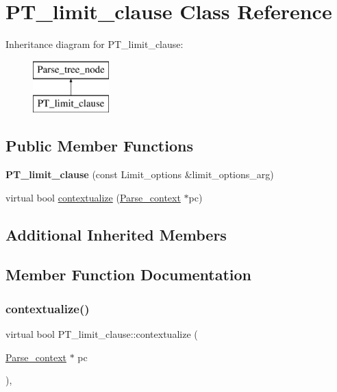 \hypertarget{classPT__limit__clause}{}\section{P\+T\+\_\+limit\+\_\+clause Class Reference}
\label{classPT__limit__clause}
Inheritance diagram for P\+T\+\_\+limit\+\_\+clause\+:\begin{figure}[H]
\begin{center}
\leavevmode
\includegraphics[height=2.000000cm]{classPT__limit__clause}
\end{center}
\end{figure}
\subsection*{Public Member Functions}
\begin{DoxyCompactItemize}
\item 
\mbox{\label{classPT__limit__clause_ad1430e91bf094c4a4a11a90a0a62ad64}} 
{\bfseries P\+T\+\_\+limit\+\_\+clause} (const Limit\+\_\+options \&limit\+\_\+options\+\_\+arg)
\item 
virtual bool \mbox{\hyperlink{classPT__limit__clause_a90ceb3c85a9f3ae67c5317b30d166b13}{contextualize}} (\mbox{\hyperlink{structParse__context}{Parse\+\_\+context}} $\ast$pc)
\end{DoxyCompactItemize}
\subsection*{Additional Inherited Members}


\subsection{Member Function Documentation}
\mbox{\label{classPT__limit__clause_a90ceb3c85a9f3ae67c5317b30d166b13}} 
\subsubsection{\texorpdfstring{contextualize()}{contextualize()}}
{\footnotesize\ttfamily virtual bool P\+T\+\_\+limit\+\_\+clause\+::contextualize (\begin{DoxyParamCaption}\item[{\mbox{\hyperlink{structParse__context}{Parse\+\_\+context}} $\ast$}]{pc }\end{DoxyParamCaption})\hspace{0.3cm}{\ttfamily [inline]}, {\ttfamily [virtual]}}

